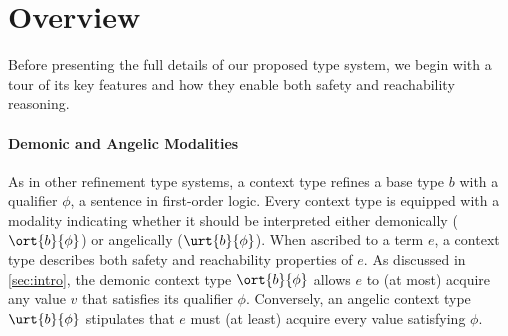 \section{Overview}
\label{sec:overview}
Before presenting the full details of our proposed type system, we
begin with a tour of its key features and how they enable both safety
and reachability reasoning.


\paragraph{Demonic and Angelic Modalities}



As in other refinement type systems, a context type refines a base
type $b$ with a qualifier $\phi$, a sentence in first-order
logic. Every context type is equipped with a modality indicating
whether it should be interpreted either demonically ($\ort{b}{\phi}$)
or angelically ($\urt{b}{\phi}$). When ascribed to a term $e$, a
context type describes both safety and reachability properties of
$e$. As discussed in \autoref{sec:intro}, the demonic context type
$\ort{b}{\phi}$ allows $e$ to (at most) acquire any value $v$ that
satisfies its qualifier $\phi$.  Conversely, an angelic context type
$\urt{b}{\phi}$ stipulates that $e$ must (at least) acquire every
value satisfying $\phi$.


